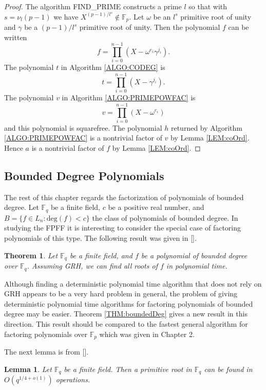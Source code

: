 \documentclass{article}
\newcounter{dummy} \numberwithin{dummy}{section}
\theoremstyle{plain}
\newtheorem{thm}[dummy]{Theorem}
\newtheorem{lem}[dummy]{Lemma}
\theoremstyle{definition}
\def\Fp {{ \mathbb{F} _ {p} }}
\def\Fq {{ \mathbb{F} _ {q} }}
\def\deg {{ \mathrm{deg}}}
\begin{document}
		\begin{proof}
		    The algorithm FIND\_PRIME constructs a prime $l$ so that with $s=\nu_l(p-1)$ we have $X^{(p-1)/l^s} \not\in \Fp$. Let $\omega$ be an $l^s$ primitive root of unity and $\gamma$ be a $(p-1)/l^s$ primitive root of unity. Then the polynomial $f$ can be written 
				    \[ f=\prod_{i=0}^{n-1}{(X-\omega^{e_i}\gamma^{j_i})}. \]	
				The polynomial $t$ in Algorithm \ref{ALGO:CODEG} is 
				    \[ t=\prod_{i=0}^{n-1}{(X-\gamma^{j_i})}. \]
			  The polynomial $v$ in Algorithm \ref{ALGO:PRIMEPOWFAC} is 
				    \[ v=\prod_{i=0}^{n-1}{(X-\omega^{e_i})} \]
				and this polynomial is squarefree. The polynomial $h$ returned by Algorithm \ref{ALGO:PRIMEPOWFAC} is a nontrivial factor of $v$ by Lemma \ref{LEM:coOrd}. Hence $a$ is a nontrivial factor of $f$ by Lemma \ref{LEM:coOrd}.
		\end{proof}
						
    \subsection{Bounded Degree Polynomials}
		\label{SEC:bounded}
		
		The rest of this chapter regards the factorization of polynomials of bounded degree. Let $\Fq$ be a finite field, $c$ be a positive real number, and $B=\{ f\in L_n : \deg(f)<c \}$ the class of polynomials of bounded degree. In studying the FPFF it is interesting to consider the special case of factoring polynomials of this type. The following result was given in [].

    \begin{thm}
		\label{THM:GRHBOUNDED}
        Let $\Fq$ be a finite field, and $f$ be a polynomial of bounded degree over $\Fq$. Assuming GRH, we can find all roots of $f$ in polynomial time. 
    \end{thm}
		
		Although finding a deterministic polynomial time algorithm that does not rely on GRH appears to be a very hard problem in general, the problem of giving deterministic polynomial time algorithms for factoring polynomials of bounded degree may be easier. Theorem \ref{THM:boundedDeg} gives a new result in this direction. This result should be compared to the fastest general algorithm for factoring polynomials over $\Fp$ which was given in Chapter 2.
		
		The next lemma is from [].
		
		\begin{lem}
		\label{LEM:leastPrim}
		    Let $\Fq$ be a finite field. Then a primitive root in $\Fq$ can be found in $O(q^{{1/4}+o(1)})$ operations.
		\end{lem}
		
\end{document}
